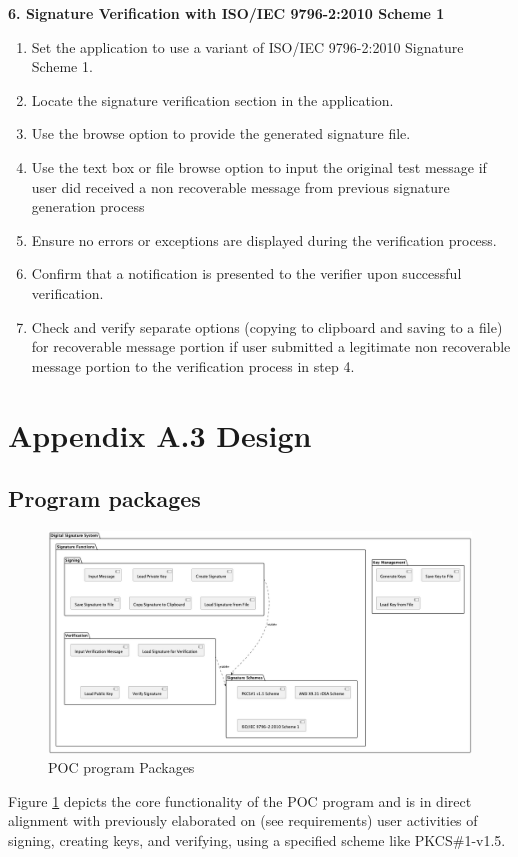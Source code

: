 \documentclass[]{final_report}
\theoremstyle{definition}
\begin{document}
\textbf{6. Signature Verification with ISO/IEC 9796-2:2010 Scheme 1}
\begin{enumerate}
\item Set the application to use a variant of ISO/IEC 9796-2:2010 Signature Scheme 1.
\item Locate the signature verification section in the application.
\item Use the browse option to provide the generated signature file.
\item Use the text box or file browse option to input the original test message if user did received a non recoverable message from previous signature generation process
\item Ensure no errors or exceptions are displayed during the verification process.
\item Confirm that a notification is presented to the verifier upon successful verification.
\item Check and verify separate options (copying to clipboard and saving to a file) for  recoverable message portion if user submitted a legitimate non recoverable message portion to the verification process in step 4.
\end{enumerate}

\section{Appendix A.3 Design}
\subsection{Program packages}
\begin{figure}[H]
    \centering
    \includegraphics[scale=0.31]{package.png}
    \caption{POC program Packages}
    \label{fig:pack}
\end{figure}
Figure \ref{fig:pack} depicts the core functionality of the POC program and is in direct alignment with previously elaborated on (see requirements) user activities of signing, creating keys, and verifying, using a specified scheme like PKCS\#1-v1.5.
\end{document}
